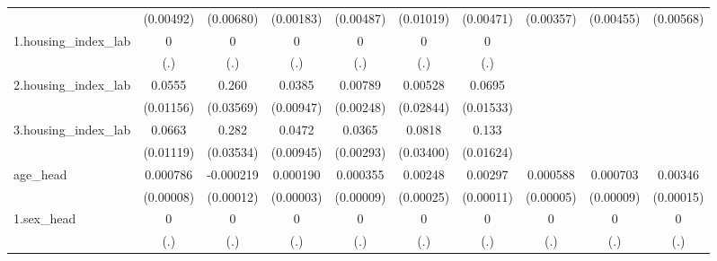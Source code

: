 \begin{table}[htbp]
\begin{tabular}{l*{9}{c}}
            &   (0.00492)         &   (0.00680)         &   (0.00183)         &   (0.00487)         &   (0.01019)         &   (0.00471)         &   (0.00357)         &   (0.00455)         &   (0.00568)         \\
1.housing\_index\_lab&           0         &           0         &           0         &           0         &           0         &           0         &                     &                     &                     \\
            &         (.)         &         (.)         &         (.)         &         (.)         &         (.)         &         (.)         &                     &                     &                     \\
2.housing\_index\_lab&      0.0555\sym{***}&       0.260\sym{***}&      0.0385\sym{***}&     0.00789\sym{***}&     0.00528         &      0.0695\sym{***}&                     &                     &                     \\
            &   (0.01156)         &   (0.03569)         &   (0.00947)         &   (0.00248)         &   (0.02844)         &   (0.01533)         &                     &                     &                     \\
3.housing\_index\_lab&      0.0663\sym{***}&       0.282\sym{***}&      0.0472\sym{***}&      0.0365\sym{***}&      0.0818\sym{**} &       0.133\sym{***}&                     &                     &                     \\
            &   (0.01119)         &   (0.03534)         &   (0.00945)         &   (0.00293)         &   (0.03400)         &   (0.01624)         &                     &                     &                     \\
age\_head    &    0.000786\sym{***}&   -0.000219\sym{*}  &    0.000190\sym{***}&    0.000355\sym{***}&     0.00248\sym{***}&     0.00297\sym{***}&    0.000588\sym{***}&    0.000703\sym{***}&     0.00346\sym{***}\\
            &   (0.00008)         &   (0.00012)         &   (0.00003)         &   (0.00009)         &   (0.00025)         &   (0.00011)         &   (0.00005)         &   (0.00009)         &   (0.00015)         \\
1.sex\_head  &           0         &           0         &           0         &           0         &           0         &           0         &           0         &           0         &           0         \\
            &         (.)         &         (.)         &         (.)         &         (.)         &         (.)         &         (.)         &         (.)         &         (.)         &         (.)         \\

\end{tabular}
\end{table}
